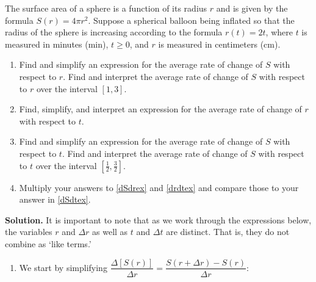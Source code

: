 \begin{ex}\label{surfaceareaex2chainrule}  The surface area of a sphere is a function of its radius $r$ and is given by the formula $S(r) = 4 \pi r^2$.  Suppose a spherical balloon being inflated so that the radius of the sphere is increasing according to the formula $r(t) = 2t$, where $t$ is measured in minutes (min), $t \geq 0$, and $r$ is measured in centimeters (cm). 

\begin{enumerate}

\item\label{dSdrex}  Find and simplify an expression for the average rate of change of $S$ with respect to $r$.   Find and interpret the average rate of change of $S$ with respect to $r$  over the interval $[1, 3]$.

\item\label{drdtex} Find, simplify, and interpret an expression for the average rate of change of $r$ with respect to $t$.

\item\label{dSdtex} Find and simplify an expression for the average rate of change of $S$ with respect to $t$.  Find and interpret the average rate of change of $S$ with respect to $t$  over the interval $\left[\frac{1}{2}, \frac{3}{2}\right]$.


\item  Multiply your answers to \ref{dSdrex} and \ref{drdtex} and compare those to your answer in \ref{dSdtex}.

\end{enumerate}

{\bf Solution.}  It is important to note that as we work through the expressions below, the variables $r$ and $\Delta r$ as well as $t$ and $\Delta t$ are distinct. That is, they do not combine as `like terms.'

\begin{enumerate}

\item  We start by simplifying $\dfrac{\Delta[S(r)]}{\Delta r} = \dfrac{S(r+ \Delta r) - S(r)}{\Delta r}$:

\begin{longtable}{rcl}


\end{longtable}
\end{enumerate}
\end{ex}
